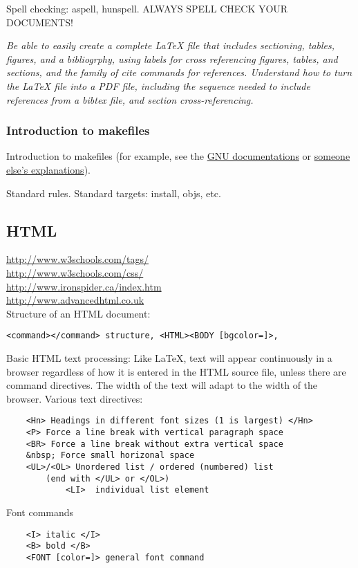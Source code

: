 \documentclass{article}
\newcommand{\test}[1]{%
    \begin{center}
        \colorbox{hl}{\parbox{0.9\textwidth}{\emph{#1}}}
    \end{center}}
\begin{document}
Spell checking: aspell, hunspell. ALWAYS SPELL CHECK YOUR DOCUMENTS!

\test{Be able to easily create a complete LaTeX file that includes
sectioning, tables, figures, and a bibliogrphy, using labels for cross
referencing figures, tables, and sections, and the family of cite
commands for references. Understand how to turn the LaTeX file into a
PDF file, including the sequence needed to include references from a
bibtex file, and section cross-referencing.}

\subsubsection{Introduction to makefiles}
Introduction to makefiles (for example, see the
\href{https://www.gnu.org/software/make/manual/html_node/index.html#Top}
{GNU documentations} or
\href{http://www.rsmas.miami.edu/personal/miskandarani/Courses/MSC321/make.pdf}
{someone else's explanations}).

Standard rules. Standard targets: install, objs, etc.

\subsection{HTML}

\url{http://www.w3schools.com/tags/}\\
\url{http://www.w3schools.com/css/}\\
\url{http://www.ironspider.ca/index.htm}\\
\url{http://www.advancedhtml.co.uk}\\

Structure of an HTML document:
\begin{verbatim}
<command></command> structure, <HTML><BODY [bgcolor=]>,
\end{verbatim}

Basic HTML text processing: Like LaTeX, text will appear continuously in a browser
regardless of how it is entered in the HTML source file, unless there
are command directives. The width of the text will adapt to the width
of the browser. Various text directives:
\begin{verbatim}
    <Hn> Headings in different font sizes (1 is largest) </Hn>
    <P> Force a line break with vertical paragraph space
    <BR> Force a line break without extra vertical space
    &nbsp; Force small horizonal space
    <UL>/<OL> Unordered list / ordered (numbered) list
        (end with </UL> or </OL>)
            <LI>  individual list element
\end{verbatim}
Font commands
\begin{verbatim}
    <I> italic </I>
    <B> bold </B>
    <FONT [color=]> general font command
\end{verbatim}
\end{document}
